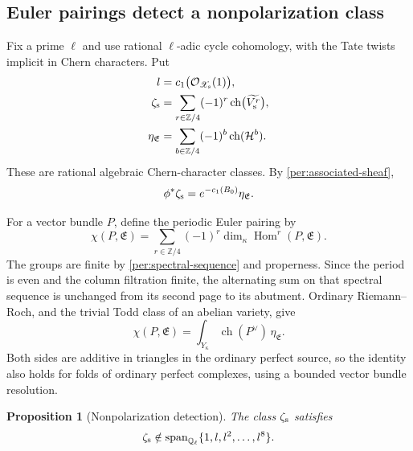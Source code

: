 \documentclass[11pt]{article}
\newtheorem{proposition}[theorem]{Proposition}
\theoremstyle{definition}
\theoremstyle{remark}
\numberwithin{equation}{section}
\begin{document}
\subsection{Euler pairings detect a nonpolarization class}

Fix a prime $\ell$ and use rational $\ell$-adic cycle cohomology,
with the Tate twists implicit in Chern characters.  Put
\begin{equation}
 \begin{split}
 l&=c_1\bigl(\mathcal O_{\mathscr X_{\rm s}}(1)\bigr),\\
 \zeta_{\rm s}
   &=\sum_{r\in\mathbb Z/4}(-1)^r
                  \operatorname{ch}\bigl(\widetilde{V_{\rm s}^r}\bigr),\\
 \eta_{\mathfrak E}
   &=\sum_{b\in\mathbb Z/4}(-1)^b\operatorname{ch}(\mathcal H^b).
 \end{split}
 \label{per:characters}
\end{equation}
These are rational algebraic Chern-character classes.  By
\eqref{per:associated-sheaf},
\begin{equation}
 \phi^*\zeta_{\rm s}
       =e^{-c_1(B_0)}\eta_{\mathfrak E}.
 \label{per:character-comparison}
\end{equation}

For a vector bundle $P$, define the periodic Euler pairing by
\[
 \chi(P,\mathfrak E)
    =\sum_{r\in\mathbb Z/4}(-1)^r
                       \dim_\kappa\operatorname{Hom}^r(P,\mathfrak E).
\]
The groups are finite by \eqref{per:spectral-sequence} and properness.
Since the period is even and the column filtration finite, the
alternating sum on that spectral sequence is unchanged from its
second page to its abutment.  Ordinary Riemann--Roch, and the trivial
Todd class of an abelian variety, give
\begin{equation}
 \chi(P,\mathfrak E)
    =\int_{Y_\kappa}\operatorname{ch}(P^\vee)\,\eta_{\mathfrak E}.
 \label{per:rr}
\end{equation}
Both sides are additive in triangles in the ordinary perfect source,
so the identity also holds for folds of ordinary perfect complexes,
using a bounded vector bundle resolution.

\begin{proposition}[Nonpolarization detection]
\label{per:nonpolarization}
The class $\zeta_{\rm s}$ satisfies
\begin{equation}
 \zeta_{\rm s}\notin
       \operatorname{span}_{\mathbb Q_\ell}\{1,l,l^2,\ldots,l^8\}.
 \label{per:nonpolarization-equation}
\end{equation}
\end{proposition}
\end{document}
